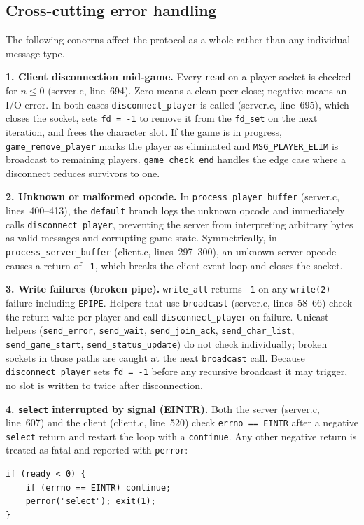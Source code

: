 \documentclass[11pt,letterpaper]{article}
\begin{document}
\subsection*{Cross-cutting error handling}

The following concerns affect the protocol as a whole rather than any individual message type.

\textbf{1. Client disconnection mid-game.} Every \texttt{read} on a player socket is checked for $n \leq 0$ (server.c, line~694). Zero means a clean peer close; negative means an I/O error. In both cases \texttt{disconnect\_player} is called (server.c, line~695), which closes the socket, sets \texttt{fd = -1} to remove it from the \texttt{fd\_set} on the next iteration, and frees the character slot. If the game is in progress, \texttt{game\_remove\_player} marks the player as eliminated and \texttt{MSG\_PLAYER\_ELIM} is broadcast to remaining players. \texttt{game\_check\_end} handles the edge case where a disconnect reduces survivors to one.

\textbf{2. Unknown or malformed opcode.} In \texttt{process\_player\_buffer} (server.c, lines~400--413), the \texttt{default} branch logs the unknown opcode and immediately calls \texttt{disconnect\_player}, preventing the server from interpreting arbitrary bytes as valid messages and corrupting game state. Symmetrically, in \texttt{process\_server\_buffer} (client.c, lines~297--300), an unknown server opcode causes a return of \texttt{-1}, which breaks the client event loop and closes the socket.

\textbf{3. Write failures (broken pipe).} \texttt{write\_all} returns \texttt{-1} on any \texttt{write(2)} failure including \texttt{EPIPE}. Helpers that use \texttt{broadcast} (server.c, lines~58--66) check the return value per player and call \texttt{disconnect\_player} on failure. Unicast helpers (\texttt{send\_error}, \texttt{send\_wait}, \texttt{send\_join\_ack}, \texttt{send\_char\_list}, \texttt{send\_game\_start}, \texttt{send\_status\_update}) do not check individually; broken sockets in those paths are caught at the next \texttt{broadcast} call. Because \texttt{disconnect\_player} sets \texttt{fd = -1} before any recursive broadcast it may trigger, no slot is written to twice after disconnection.

\textbf{4. \texttt{select} interrupted by signal (EINTR).} Both the server (server.c, line~607) and the client (client.c, line~520) check \texttt{errno == EINTR} after a negative \texttt{select} return and restart the loop with a \texttt{continue}. Any other negative return is treated as fatal and reported with \texttt{perror}:
\begin{lstlisting}
if (ready < 0) {
    if (errno == EINTR) continue;
    perror("select"); exit(1);
}
\end{lstlisting}
\end{document}
